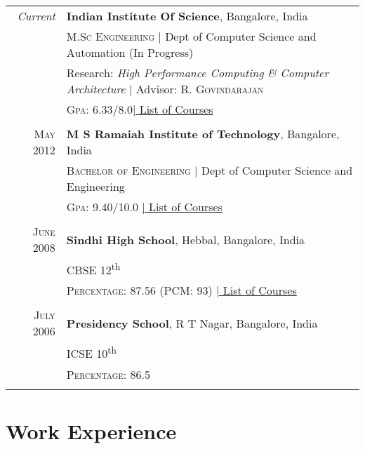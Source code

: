 \documentclass[a4paper,10pt]{article} %
\begin{document}
\begin{tabular}{rl}	
\emph{Current} & \textbf{Indian Institute Of Science}, Bangalore, India\\
& \textsc{M.Sc Engineering} | Dept of Computer Science and Automation (In Progress)\\
& Research: \small\emph{High Performance Computing \& Computer Architecture} | Advisor: R. \textsc{Govindarajan}\\
&\normalsize \textsc{Gpa}: 6.33/8.0\hyperlink{iisc}{\hfill | \footnotesize List of Courses}\\
&\\


\textsc{May} 2012 & \textbf{M S Ramaiah Institute of Technology}, Bangalore, India\\
& \textsc{Bachelor of Engineering} | Dept of Computer Science and Engineering \\
&\normalsize \textsc{Gpa}: 9.40/10.0 \hyperlink{msrit}{\hfill| \footnotesize List of Courses}\\
&\\


\textsc{June} 2008 & \textbf{Sindhi High School}, Hebbal, Bangalore, India\\
& \textsc{CBSE 12}\textsuperscript{th} \\
&\normalsize \textsc{Percentage}: 87.56 (PCM: 93) \hyperlink{hs}{\hfill| \footnotesize List of Courses}\\
&\\


\textsc{July} 2006 & \textbf{Presidency School}, R T Nagar, Bangalore, India\\
& \textsc{ICSE 10}\textsuperscript{th} \\
&\normalsize \textsc{Percentage}: 86.5 \\
&\\
\end{tabular}


\section{Work Experience}
\end{document}
